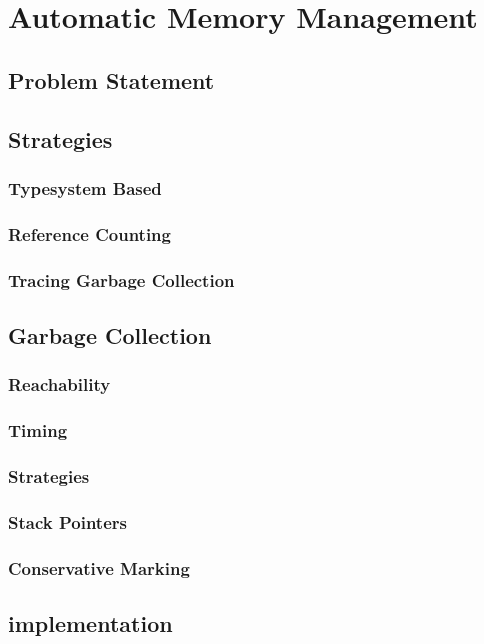 \chapter{Automatic Memory Management}
\section{Problem Statement}
\section{Strategies}
\subsection{Typesystem Based}
\subsection{Reference Counting}
\subsection{Tracing Garbage Collection}
\section{Garbage Collection}
\subsection{Reachability}
\subsection{Timing}
\subsection{Strategies}
\subsection{Stack Pointers}
\subsection{Conservative Marking}
\section{\Rift implementation}
